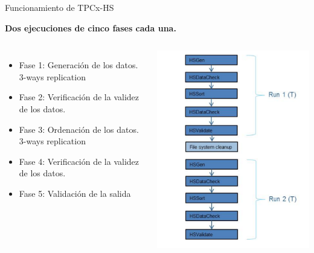 		\begin{frame}{Funcionamiento de TPCx-HS}
			\begin{tcolorbox}[colback=ChetwodeBlue!10,colframe=ChetwodeBlue!60]
				\fontsize{8}{8}\selectfont
				\centering
				\textbf{Dos ejecuciones de cinco fases cada una.}
			\end{tcolorbox}
			
				\begin{columns}[c]
						\fontsize{8}{10}\selectfont
											
						\begin{itemize}
							\item Fase 1: Generación de los datos. \\ 3-ways replication
							\item Fase 2: Verificación de la validez de los datos.
							\item Fase 3: Ordenación de los datos.  \\ 3-ways replication
							\item Fase 4: Verificación de la validez de los datos.
							\item Fase 5: Validación de la salida
						\end{itemize}
					
						\includegraphics[width=\textwidth]{./Images/executionsTPC.png}
				\end{columns}
	
		\end{frame}
		
